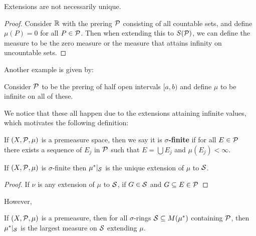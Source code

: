 \begin{proposition}
    Extensions are not necessarily unique.
\end{proposition}

\begin{proof}
    Consider $\mathbb R$ with the prering $\mathcal P$ consisting of all countable sets, and define $\mu(P) = 0$ for all $P \in \mathcal P$. Then when extending this to $S(\mathcal P)$, we can define the measure to be the zero measure or the measure that attains infinity on uncountable sets.
\end{proof}

Another example is given by:

\begin{example}
    Consider $\mathcal P$ to be the prering of half open intervals $[a, b)$ and define $\mu$ to be infinite on all of these.    
\end{example}

We notice that these all happen due to the extensions attaining infinite values, which motivates the following definition:

\begin{definition}
    If $(X, \mathcal P, \mu)$ is a premeasure space, then we say it is \textbf{$\sigma$-finite} if for all $E \in \mathcal P$ there exists a sequence of $E_j$ in $\mathcal P$ such that $E = \bigcup E_j$ and $\mu(E_j) < \infty$.
\end{definition}

\begin{theorem}
    If $(X, \mathcal P, \mu)$ is $\sigma$-finite then $\mu^*\vert_\mathcal{S}$ is the unique extension of $\mu$ to $\mathcal S$.
\end{theorem}

\begin{proof}
    If $\nu$ is any extension of $\mu$ to $\mathcal S$, if $G \in \mathcal S$ and $G \subseteq E \in \mathcal P$ 
\end{proof}

However, 

\begin{proposition}
    If $(X, \mathcal P, \mu)$ is a premeasure, then for all $\sigma$-rings $\mathcal S \subseteq M(\mu^*)$ containing $\mathcal P$, then $\mu^*\vert_\mathcal{S}$ is the largest measure on $\mathcal S$ extending $\mu$.
\end{proposition}